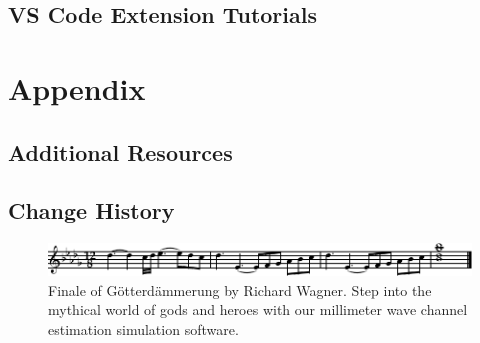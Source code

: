 \documentclass[use boldface]{beaulivre}
\begin{document}
\chapter{VS Code Extension Tutorials}


\appendix

\cleardoublepage
\cleardoublepage
{}
{}
\part*{Appendix}
\chapter{Additional Resources}


\chapter{Change History}


\printbibliography[heading=bibintoc]

\turnoffhypercolor
\printindex

\begin{figure}[!b]
  \centering
  \includegraphics[width=\linewidth]{fig/mtx/ring_finale.pdf}
  \caption*{Finale of G\"otterd\"ammerung by Richard Wagner.
  Step into the mythical world of gods and heroes with our millimeter wave channel estimation simulation software.}
\end{figure}
\end{document}
